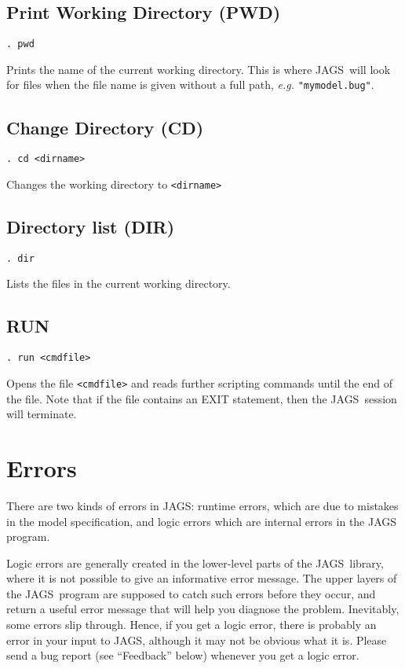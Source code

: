 \documentclass[11pt, a4paper, titlepage]{report}
\newcommand{\JAGS}{\textsf{JAGS}}
\begin{document}
\subsection{Print Working Directory (PWD)}
\begin{verbatim}
. pwd
\end{verbatim}
Prints the name of the current working directory. This is where \JAGS\
will look for files when the file name is given without a full path, 
{\em e.g.} \verb+"mymodel.bug"+.

\subsection{Change Directory (CD)}
\begin{verbatim}
. cd <dirname>
\end{verbatim}
Changes the working directory to \texttt{<dirname>}

\subsection{Directory list (DIR)}
\begin{verbatim}
. dir
\end{verbatim}
Lists the files in the current working directory.

\subsection{RUN}
\begin{verbatim}
. run <cmdfile>
\end{verbatim}
Opens the file \texttt{<cmdfile>} and reads further scripting commands
until the end of the file.  Note that if the file contains an EXIT
statement, then the \JAGS\ session will terminate. 


\section{Errors}

There are two kinds of errors in \JAGS: runtime errors, which are due to
mistakes in the model specification, and logic errors which are internal
errors in the JAGS program. 

Logic errors are generally created in the lower-level parts of the \JAGS\
library, where it is not possible to give an informative error message.
The upper layers of the \JAGS\ program are supposed to catch such errors
before they occur, and return a useful error message that will help you
diagnose the problem.  Inevitably, some errors slip through. Hence,
if you get a logic error, there is probably an error in your input to
\JAGS, although it may not be obvious what it is. Please send a bug
report (see ``Feedback'' below) whenever you get a logic error.
\end{document}
